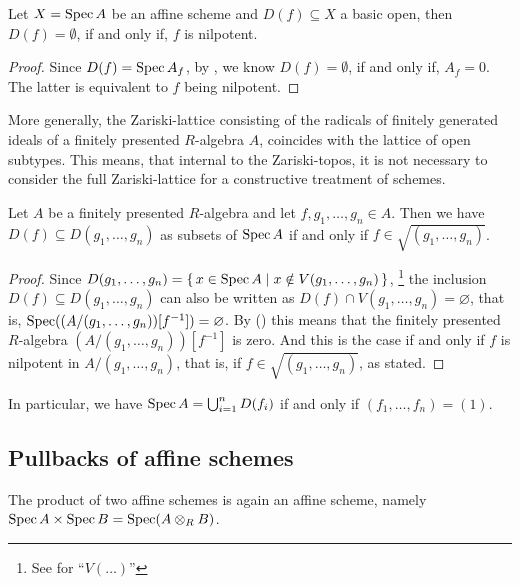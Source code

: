 \begin{lemma}%
  \label{basic-open-empty}
  Let $X=\operatorname{Spec} A$ be an affine scheme and $D(f)\subseteq X$ a basic open,
  then $D(f)=\emptyset$, if and only if, $f$ is nilpotent.
\end{lemma}

\begin{proof}
  Since $D(f)=\operatorname{Spec} A_f$, by , we know $D(f)=\emptyset$,
  if and only if, $A_f=0$.
  The latter is equivalent to $f$ being nilpotent.
\end{proof}

More generally,
the Zariski-lattice consisting of the radicals
of finitely generated ideals of a finitely presented $R$-algebra $A$,
coincides with the lattice of open subtypes.
This means, that internal to the Zariski-topos,
it is not necessary to consider the full Zariski-lattice for a constructive treatment of schemes.

\begin{lemma}%
  Let $A$ be a finitely presented $R$-algebra
  and let $f, g_1, \dots, g_n \in A$.
  Then we have $D(f) \subseteq D(g_1, \dots, g_n)$
  as subsets of $\operatorname{Spec} A$
  if and only if $f \in \sqrt{(g_1, \dots, g_n)}$.
\end{lemma}

\begin{proof}
  Since $D(g_1, \dots, g_n) = \{\, x \in \operatorname{Spec} A \mid x \notin V(g_1, \dots, g_n) \,\}$,
  \footnote{See  for ``$V(\dots)$''}
  the inclusion $D(f) \subseteq D(g_1, \dots, g_n)$
  can also be written as
  $D(f) \cap V(g_1, \dots, g_n) = \varnothing$, that is,
  $\operatorname{Spec}((A/(g_1, \dots, g_n))[f^{-1}]) = \varnothing$.
  By ()
  this means that the finitely presented $R$-algebra $(A/(g_1, \dots, g_n))[f^{-1}]$
  is zero.
  And this is the case if and only if $f$ is nilpotent in $A/(g_1, \dots, g_n)$,
  that is, if $f \in \sqrt{(g_1, \dots, g_n)}$, as stated.
\end{proof}

In particular,
we have $\operatorname{Spec} A = \bigcup_{i = 1}^n D(f_i)$
if and only if $(f_1, \dots, f_n) = (1)$.

\subsection{Pullbacks of affine schemes}

\begin{lemma}%
  \label{affine-product}
  The product of two affine schemes is again an affine scheme,
  namely
  $\operatorname{Spec} A \times \operatorname{Spec} B = \operatorname{Spec} (A \otimes_R B)$.
\end{lemma}

